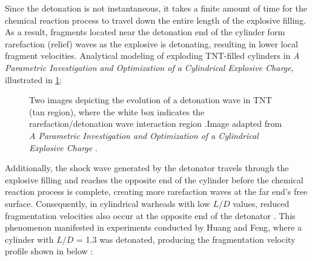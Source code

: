 Since the detonation is not instantaneous, it takes a finite amount of time for the chemical reaction process to travel down the entire length of the explosive filling. As a result, fragments located near the detonation end of the cylinder form rarefaction (relief) waves as the explosive is detonating, resulting in lower local fragment velocities. Analytical modeling of exploding TNT-filled cylinders in \textit{A Parametric Investigation and Optimization of a Cylindrical Explosive Charge}, illustrated in \cref{fig:2_Sawtooth_waves}: 
\begin{figure}[H]
	\centering
    \caption{Two images depicting the evolution of a detonation wave in TNT (tan region), where the white box indicates the rarefaction/detonation wave interaction region .Image adapted from \textit{A Parametric Investigation and Optimization of a Cylindrical Explosive Charge} \cite{MarquetteEndEffects}.}
	\label{fig:2_Sawtooth_waves}
\end{figure}
%
Additionally, the shock wave generated by the detonator travels through the explosive filling and reaches the opposite end of the cylinder before the chemical reaction process is complete, creating more rarefaction waves at the far end's free surface. Consequently, in cylindrical warheads with low $L/D$ values, reduced fragmentation velocities also occur at the opposite end of the detonator \cite{AFIT_Yves,MarquetteEndEffects}. This phenomenon manifested in experiments conducted by Huang and Feng, where a cylinder with $L/D$ = 1.3 was detonated, producing the fragmentation velocity profile shown in  below \cite{HuangEndEffects}:    
